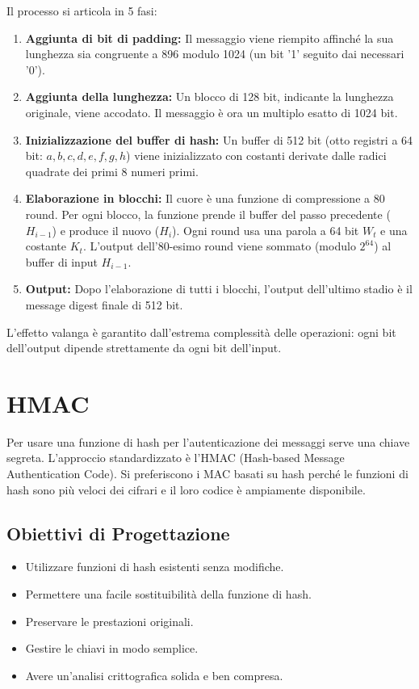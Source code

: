 Il processo si articola in 5 fasi:
\begin{enumerate}
    \item \textbf{Aggiunta di bit di padding:} Il messaggio viene riempito affinché la sua lunghezza sia congruente a 896 modulo 1024 (un bit '1' seguito dai necessari '0').
    \item \textbf{Aggiunta della lunghezza:} Un blocco di 128 bit, indicante la lunghezza originale, viene accodato. Il messaggio è ora un multiplo esatto di 1024 bit.
    \item \textbf{Inizializzazione del buffer di hash:} Un buffer di 512 bit (otto registri a 64 bit: $a, b, c, d, e, f, g, h$) viene inizializzato con costanti derivate dalle radici quadrate dei primi 8 numeri primi.
    \item \textbf{Elaborazione in blocchi:} Il cuore è una funzione di compressione a 80 round. Per ogni blocco, la funzione prende il buffer del passo precedente ($H_{i-1}$) e produce il nuovo ($H_i$). Ogni round usa una parola a 64 bit $W_t$ e una costante $K_t$. L'output dell'80-esimo round viene sommato (modulo $2^{64}$) al buffer di input $H_{i-1}$.
    \item \textbf{Output:} Dopo l'elaborazione di tutti i blocchi, l'output dell'ultimo stadio è il message digest finale di 512 bit.
\end{enumerate}
L'effetto valanga è garantito dall'estrema complessità delle operazioni: ogni bit dell'output dipende strettamente da ogni bit dell'input.

\section{HMAC}

Per usare una funzione di hash per l'autenticazione dei messaggi serve una chiave segreta. L'approccio standardizzato è l'HMAC (Hash-based Message Authentication Code). Si preferiscono i MAC basati su hash perché le funzioni di hash sono più veloci dei cifrari e il loro codice è ampiamente disponibile.

\subsection{Obiettivi di Progettazione}
\begin{itemize}
    \item Utilizzare funzioni di hash esistenti senza modifiche.
    \item Permettere una facile sostituibilità della funzione di hash.
    \item Preservare le prestazioni originali.
    \item Gestire le chiavi in modo semplice.
    \item Avere un'analisi crittografica solida e ben compresa.
\end{itemize}

